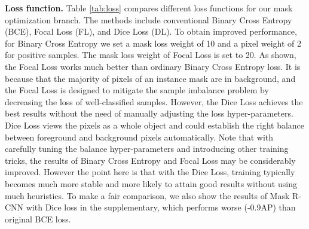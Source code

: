 \documentclass[runningheads]{llncs}
\newcommand{\myparagraph}[1]{{ \noindent \bf #1}}
\begin{document}
\myparagraph{Loss function.} Table \ref{tab:loss} compares different loss functions for our mask optimization branch. The methods include conventional Binary Cross Entropy (BCE), Focal Loss (FL), and Dice Loss (DL).
To obtain improved performance, for Binary Cross Entropy we set a mask loss weight of 10 and a pixel weight of 2 for positive samples.
The mask loss weight of Focal Loss is set to 20.
As shown, the Focal Loss works much better than ordinary Binary Cross Entropy loss.
It is because that the majority of pixels of an instance mask are in background, and the Focal Loss is
designed to mitigate
the sample imbalance problem by decreasing the loss of well-classified samples.
However, the Dice Loss achieves the best results without the need of manually adjusting the loss hyper-parameters.
Dice Loss
views the pixels as a whole object and could establish
the right balance between foreground and background pixels automatically.
Note that with carefully tuning the balance hyper-parameters and introducing
other training tricks,  the results of Binary Cross Entropy
and Focal Loss may be considerably improved. However the point here is that with
the
Dice Loss, training  typically becomes much more stable and more likely to attain good results without using much heuristics.
To make a fair comparison, we also show the results of Mask R-CNN with Dice loss in the supplementary, which performs worse (-0.9AP) than original BCE loss.

\begin{table}[t]
    \centering
     \caption{\textbf{Different loss functions}
 may be employed
in the mask branch. The Dice loss (DL) leads to best AP and is more stable to train.}

     \label{tab:loss}
\end{table}
\end{document}
